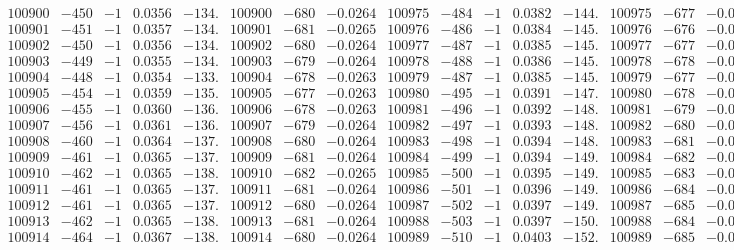 \documentclass[11pt,reqno,a4letter]{article}
\numberwithin{figure}{section}
\numberwithin{table}{section}
\theoremstyle{plain}
\numberwithin{theorem}{section}
\theoremstyle{definition}
\begin{document}
\begin{table}[ht!]
\begin{equation*}
{\begin{array}{ccccc|ccc||ccccc|ccc}
100900 & -450 & -1 & 0.0356 & -134. & 100900 & -680 & -0.0264 & 100975 & -484 & -1 & 0.0382 & -144. & 100975 & -677 & -0.0263  \\
100901 & -451 & -1 & 0.0357 & -134. & 100901 & -681 & -0.0265 & 100976 & -486 & -1 & 0.0384 & -145. & 100976 & -676 & -0.0262  \\
100902 & -450 & -1 & 0.0356 & -134. & 100902 & -680 & -0.0264 & 100977 & -487 & -1 & 0.0385 & -145. & 100977 & -677 & -0.0263  \\
100903 & -449 & -1 & 0.0355 & -134. & 100903 & -679 & -0.0264 & 100978 & -488 & -1 & 0.0386 & -145. & 100978 & -678 & -0.0263  \\
100904 & -448 & -1 & 0.0354 & -133. & 100904 & -678 & -0.0263 & 100979 & -487 & -1 & 0.0385 & -145. & 100979 & -677 & -0.0263  \\
100905 & -454 & -1 & 0.0359 & -135. & 100905 & -677 & -0.0263 & 100980 & -495 & -1 & 0.0391 & -147. & 100980 & -678 & -0.0263  \\
100906 & -455 & -1 & 0.0360 & -136. & 100906 & -678 & -0.0263 & 100981 & -496 & -1 & 0.0392 & -148. & 100981 & -679 & -0.0263  \\
100907 & -456 & -1 & 0.0361 & -136. & 100907 & -679 & -0.0264 & 100982 & -497 & -1 & 0.0393 & -148. & 100982 & -680 & -0.0264  \\
100908 & -460 & -1 & 0.0364 & -137. & 100908 & -680 & -0.0264 & 100983 & -498 & -1 & 0.0394 & -148. & 100983 & -681 & -0.0264  \\
100909 & -461 & -1 & 0.0365 & -137. & 100909 & -681 & -0.0264 & 100984 & -499 & -1 & 0.0394 & -149. & 100984 & -682 & -0.0265  \\
100910 & -462 & -1 & 0.0365 & -138. & 100910 & -682 & -0.0265 & 100985 & -500 & -1 & 0.0395 & -149. & 100985 & -683 & -0.0265  \\
100911 & -461 & -1 & 0.0365 & -137. & 100911 & -681 & -0.0264 & 100986 & -501 & -1 & 0.0396 & -149. & 100986 & -684 & -0.0265  \\
100912 & -461 & -1 & 0.0365 & -137. & 100912 & -680 & -0.0264 & 100987 & -502 & -1 & 0.0397 & -149. & 100987 & -685 & -0.0266  \\
100913 & -462 & -1 & 0.0365 & -138. & 100913 & -681 & -0.0264 & 100988 & -503 & -1 & 0.0397 & -150. & 100988 & -684 & -0.0265  \\
100914 & -464 & -1 & 0.0367 & -138. & 100914 & -680 & -0.0264 & 100989 & -510 & -1 & 0.0403 & -152. & 100989 & -685 & -0.0266  \\
\end{array}
}
\end{equation*} 

\end{table}
\clearpage 
\end{document}
